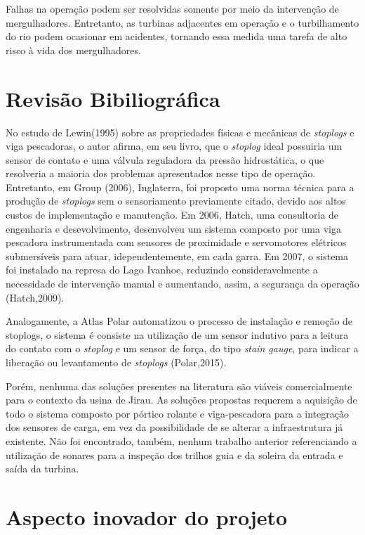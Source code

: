 Falhas na operação podem ser resolvidas somente por meio da intervenção de
mergulhadores. Entretanto, as turbinas adjacentes em operação e o turbilhamento
do rio podem ocasionar em acidentes, tornando essa medida uma tarefa de alto risco à vida dos
mergulhadores.

\section{Revisão Bibiliográfica}

No estudo de Lewin(1995) sobre as propriedades físicas e mecânicas de 
\textit{stoplogs} e viga pescadoras, o autor afirma, em seu livro, que o
\textit{stoplog} ideal possuiria um sensor de contato e uma válvula reguladora
da pressão hidrostática, o que resolveria a maioria dos problemas apresentados
nesse tipo de operação. Entretanto, em Group (2006), Inglaterra, foi proposto
uma norma técnica para a produção de \textit{stoplogs} sem o sensoriamento
previamente citado, devido aos altos custos de implementação e manutenção. Em
2006, Hatch, uma consultoria de engenharia e desevolvimento, desenvolveu um
sistema composto por uma viga pescadora instrumentada com sensores de
proximidade e servomotores elétricos submersíveis para atuar, idependentemente,
em cada garra. Em 2007, o sistema foi instalado na represa do Lago Ivanhoe,
reduzindo consideravelmente a necessidade de intervenção manual e aumentando,
assim, a segurança da operação (Hatch,2009).

Analogamente, a Atlas Polar automatizou o processo de instalação e remoção de
stoplogs, o sistema é consiste na utilização de um sensor indutivo para a
leitura do contato com o \textit{stoplog} e um sensor de força, do tipo
\textit{stain gauge}, para indicar a liberação ou levantamento de
\textit{stoplogs} (Polar,2015).

Porém, nenhuma das soluções presentes na literatura são viáveis comercialmente
para o contexto da usina de Jirau. As soluções propostas requerem a aquisição de todo o
sistema composto por pórtico rolante e viga-pescadora para a integração dos
sensores de carga, em vez da possibilidade de se alterar a infraestrutura já
existente.
Não foi encontrado, também, nenhum trabalho anterior referenciando a utilização
de sonares para a inspeção dos trilhos guia e da soleira da entrada e saída da turbina.

\section{Aspecto inovador do projeto}


